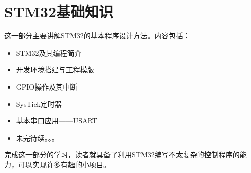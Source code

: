 \part{STM32基础知识}

这一部分主要讲解STM32的基本程序设计方法。内容包括：
\begin{itemize}
	\item STM32及其编程简介
	\item 开发环境搭建与工程模版
	\item GPIO操作及其中断
	\item SysTick定时器
	\item 基本串口应用——USART
	\item 未完待续。。。
\end{itemize}

完成这一部分的学习，读者就具备了利用STM32编写不太复杂的控制程序的能力，可以实现许多有趣的小项目。
